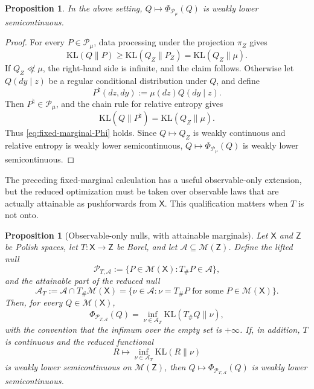 \documentclass[11pt]{article}
\newcommand{\KL}{\mathrm{KL}}
\newcommand{\Pcal}{\mathcal{P}}
\newcommand{\X}{\mathsf{X}}
\newcommand{\M}{\mathcal{M}}
\newtheorem{proposition}[theorem]{Proposition}
\theoremstyle{definition}
\theoremstyle{definition}
\begin{document}
\begin{proposition}
    In the above setting, \(Q\mapsto\Phi_{\Pcal_\mu}(Q)\) is weakly lower semicontinuous.
\end{proposition}

\begin{proof}
For every \(P\in\Pcal_\mu\), data processing under the projection \(\pi_Z\) gives
\[
  \KL(Q\|P)\ge \KL(Q_Z\|P_Z)=\KL(Q_Z\|\mu).
\]
If \(Q_Z\not\ll\mu\), the right-hand side is infinite, and the claim follows.  Otherwise let \(Q(dy\mid z)\) be a regular conditional distribution under \(Q\), and define
\[
  P^\natural(dz,dy):=\mu(dz)Q(dy\mid z).
\]
Then \(P^\natural\in\Pcal_\mu\), and the chain rule for relative entropy gives
\[
  \KL(Q\|P^\natural)=\KL(Q_Z\|\mu).
\]
Thus \eqref{eq:fixed-marginal-Phi} holds.  Since \(Q\mapsto Q_Z\) is weakly continuous and relative entropy is weakly lower semicontinuous, \(Q\mapsto\Phi_{\Pcal_\mu}(Q)\) is weakly lower semicontinuous.
\end{proof}


The preceding fixed-marginal calculation has a useful observable-only extension, but the reduced optimization must be taken over observable laws that are actually attainable as pushforwards from \(\X\).  This qualification matters when \(T\) is not onto.

\begin{proposition}[Observable-only nulls, with attainable marginals]\label{prop:observable-only-corrected}
Let \(\X\) and \(\mathsf Z\) be Polish spaces, let \(T:\X\to\mathsf Z\) be Borel, and let \(\mathcal A\subseteq\M(\mathsf Z)\).  Define the lifted null
\[
  \Pcal_{T,\mathcal A}
  :=
  \{P\in\M(\X):T_\#P\in\mathcal A\},
\]
and the attainable part of the reduced null
\[
  \mathcal A_T
  :=
  \mathcal A\cap T_\#\M(\X)
  =
  \{\nu\in\mathcal A:\nu=T_\#P\text{ for some }P\in\M(\X)\}.
\]
Then, for every \(Q\in\M(\X)\),
\begin{equation}\label{eq:observable-only-corrected}
  \Phi_{\Pcal_{T,\mathcal A}}(Q)
  =
  \inf_{\nu\in\mathcal A_T}\KL(T_\#Q\|\nu),
\end{equation}
with the convention that the infimum over the empty set is \(+\infty\).  If, in addition, \(T\) is continuous and the reduced functional
\[
  R\mapsto \inf_{\nu\in\mathcal A_T}\KL(R\|\nu)
\]
is weakly lower semicontinuous on \(\M(\mathsf Z)\), then \(Q\mapsto\Phi_{\Pcal_{T,\mathcal A}}(Q)\) is weakly lower semicontinuous.
\end{proposition}
\end{document}
